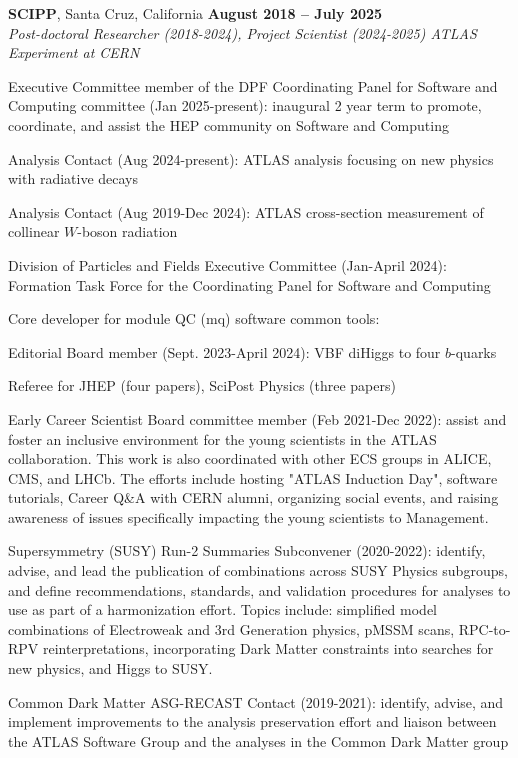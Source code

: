 \documentclass[margin,line]{resume}
\begin{document}
\begin{resume}
\textbf{SCIPP}, Santa Cruz, California \hfill \textbf{August 2018 -- July 2025}\\
\textsl{Post-doctoral Researcher (2018-2024), Project Scientist (2024-2025) ATLAS Experiment at CERN}
\begin{list2}
  \item Executive Committee member of the DPF Coordinating Panel for Software and Computing committee (Jan 2025-present): inaugural 2 year term to promote, coordinate, and assist the HEP community on Software and Computing
  \item Analysis Contact (Aug 2024-present): ATLAS analysis focusing on new physics with radiative decays
  \item Analysis Contact (Aug 2019-Dec 2024): ATLAS cross-section measurement of collinear $W$-boson radiation~\cite{ATLAS:2024mow}
  \item Division of Particles and Fields Executive Committee (Jan-April 2024): Formation Task Force for the Coordinating Panel for Software and Computing
  \item Core developer for module QC (mq) software common tools: \cite{mqt, mqat, mqdbt, ldb}
  \item Editorial Board member (Sept. 2023-April 2024): VBF diHiggs to four $b$-quarks
  \item Referee for JHEP (four papers), SciPost Physics (three papers)
  \item Early Career Scientist Board committee member (Feb 2021-Dec 2022): assist and foster an inclusive environment for the young scientists in the ATLAS collaboration. This work is also coordinated with other ECS groups in ALICE, CMS, and LHCb. The efforts include hosting "ATLAS Induction Day", software tutorials, Career Q\&A with CERN alumni, organizing social events, and raising awareness of issues specifically impacting the young scientists to Management.
  \item Supersymmetry (SUSY) Run-2 Summaries Subconvener (2020-2022): identify, advise, and lead the publication of combinations across SUSY Physics subgroups, and define recommendations, standards, and validation procedures for analyses to use as part of a harmonization effort. Topics include: simplified model combinations of Electroweak and 3rd Generation physics, pMSSM scans, RPC-to-RPV reinterpretations, incorporating Dark Matter constraints into searches for new physics, and Higgs to SUSY.
  \item Common Dark Matter ASG-RECAST Contact (2019-2021): identify, advise, and implement improvements to the analysis preservation effort and liaison between the ATLAS Software Group and the analyses in the Common Dark Matter group

\end{list2}
\end{resume}
\end{document}
